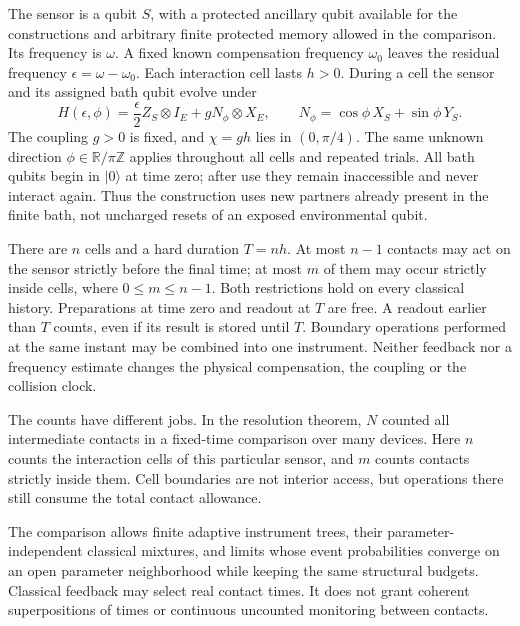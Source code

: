 \documentclass[11pt,a4paper]{article}
\numberwithin{equation}{section}
\theoremstyle{remark}
\begin{document}
The sensor is a qubit $S$, with a protected ancillary qubit available for
the constructions and arbitrary finite protected memory allowed in the
comparison. Its frequency is $\omega$. A fixed known compensation frequency
$\omega_0$ leaves the residual frequency $\epsilon=\omega-\omega_0$.
Each interaction cell lasts $h>0$. During a cell the sensor and its assigned
bath qubit evolve under
\begin{equation}
 H(\epsilon,\phi)=\frac{\epsilon}{2}Z_S\otimes I_E
       +gN_\phi\otimes X_E,
 \qquad N_\phi=\cos\phi\,X_S+\sin\phi\,Y_S.
 \label{con:H}
\end{equation}
The coupling $g>0$ is fixed, and $\chi=gh$ lies in $(0,\pi/4)$.
The same unknown direction $\phi\in\mathbb R/\pi\mathbb Z$ applies throughout all cells and repeated
trials. All bath qubits begin in $|0\rangle$ at time zero; after use they
remain inaccessible and never interact again. Thus the construction uses
new partners already present in the finite bath, not uncharged resets of
an exposed environmental qubit.

There are $n$ cells and a hard duration $T=nh$. At most $n-1$ contacts may
act on the sensor strictly before the final time; at most $m$ of them may
occur strictly inside cells, where $0\le m\le n-1$. Both restrictions hold
on every classical history. Preparations at time zero and readout at $T$
are free. A readout earlier than $T$ counts, even if its result is stored
until $T$. Boundary operations performed at the same instant may be combined
into one instrument. Neither feedback nor a frequency estimate changes the
physical compensation, the coupling or the collision clock.

The counts have different jobs. In the resolution theorem, $N$ counted
all intermediate contacts in a fixed-time comparison over many devices.
Here $n$ counts the interaction cells of this particular sensor, and $m$
counts contacts strictly inside them. Cell boundaries are not interior
access, but operations there still consume the total contact allowance.

The comparison allows finite adaptive instrument trees, their
parameter-independent classical mixtures, and limits whose event
probabilities converge on an open parameter neighborhood while keeping
the same structural budgets. Classical feedback may select real contact
times. It does not grant coherent superpositions of times or continuous
uncounted monitoring between contacts.
\end{document}
